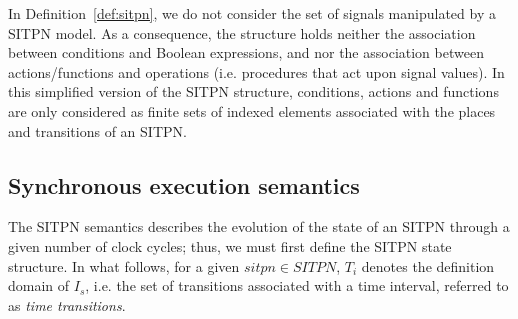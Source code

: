
In Definition~\ref{def:sitpn}, we do not consider the set of \vhdl{}
signals manipulated by a SITPN model. As a consequence, the structure
holds neither the association between conditions and Boolean
expressions, and nor the association between actions/functions and
operations (i.e. \vhdl{} procedures that act upon signal values).  In
this simplified version of the SITPN structure, conditions, actions
and functions are only considered as finite sets of indexed elements
associated with the places and transitions of an SITPN.


\subsection{Synchronous execution semantics}
\label{subsec:hpn-particularities}

 The SITPN semantics describes
the evolution of the state of an SITPN through a given number of clock
cycles; thus, we must first define the SITPN state structure. In what
follows, for a given $sitpn\in{}SITPN$, $T_i$ denotes the definition
domain of $I_s$, i.e. the set of transitions associated with a time
interval, referred to as \textit{time transitions}.


